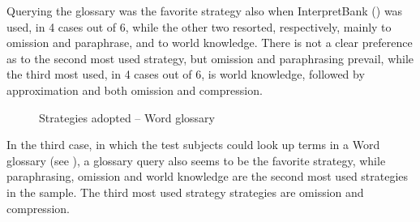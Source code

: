 \documentclass[output=paper]{langsci/langscibook}
\begin{document}
Querying the glossary was the favorite strategy also when InterpretBank () was used, in 4 cases out of 6, while the other two resorted, respectively, mainly to omission and paraphrase, and to world knowledge. There is not a clear preference as to the second most used strategy, but omission and paraphrasing prevail, while the third most used, in 4 cases out of 6, is world knowledge, followed by approximation and both omission and compression.

\begin{figure}
\caption{Strategies adopted -- Word glossary} 
\label{fig:prandi:16}
\end{figure}

 In the third case, in which the test subjects could look up terms in a Word glossary (see ), a glossary query also seems to be the favorite strategy, while paraphrasing, omission and world knowledge are the second most used strategies in the sample. The third most used strategy strategies are omission and compression. 
 
\end{document}
